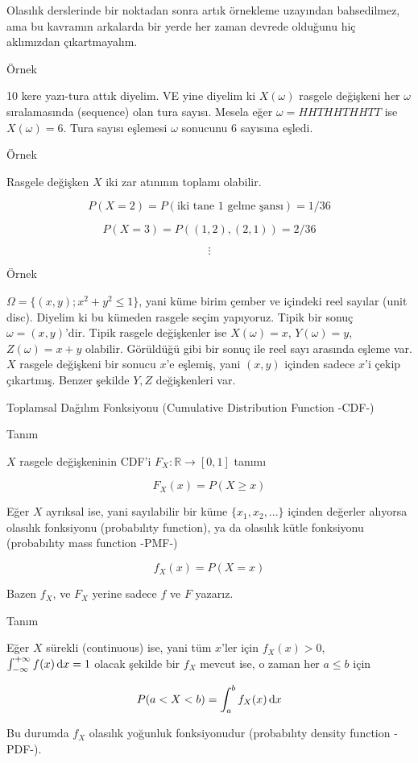 \documentclass[12pt,fleqn]{article}\usepackage{../../common}
\begin{document}
Olasılık derslerinde bir noktadan sonra artık örnekleme uzayından
bahsedilmez, ama bu kavramın arkalarda bir yerde her zaman devrede olduğunu
hiç aklımızdan çıkartmayalım. 

Örnek

10 kere yazı-tura attık diyelim. VE yine diyelim ki $X(\omega)$ rasgele
değişkeni her $\omega$ sıralamasında (sequence) olan tura sayısı. Mesela
eğer $\omega = HHTHHTHHTT$ ise $X(\omega) = 6$. Tura sayısı eşlemesi
$\omega$ sonucunu 6 sayısına eşledi.

Örnek

Rasgele değişken $X$ iki zar atınının toplamı olabilir. 

$$ P(X=2) = P(\textrm{iki tane 1 gelme şansı}) = 1/36 $$

$$ P(X=3) = P((1,2),(2,1)) = 2/36 $$

$$ \vdots $$

Örnek 

$\Omega = \{ (x,y); x^2+y^2 \le 1 \}$, yani küme birim çember ve içindeki
reel sayılar (unit disc). Diyelim ki bu kümeden rasgele seçim
yapıyoruz. Tipik bir sonuç $\omega = (x,y)$'dir. Tipik rasgele değişkenler
ise $X(\omega) = x$, $Y(\omega) = y$, $Z(\omega) = x+y$ olabilir. Görüldüğü
gibi bir sonuç ile reel sayı arasında eşleme var. $X$ rasgele değişkeni
bir sonucu $x$'e eşlemiş, yani $(x,y)$ içinden sadece $x$'i çekip
çıkartmış. Benzer şekilde $Y,Z$ değişkenleri var. 

Toplamsal Dağılım Fonksiyonu (Cumulative Distribution Function -CDF-)

Tanım

$X$ rasgele değişkeninin CDF'i $F_X: \mathbb{R} \to [0,1]$ tanımı

$$ F_X(x) = P(X \ge x) $$

Eğer $X$ ayrıksal ise, yani sayılabilir bir küme $\{x_1,x_2,...\}$ içinden
değerler alıyorsa olasılık fonksiyonu (probabılıty function), ya da
olasılık kütle fonksiyonu (probabılıty mass function -PMF-) 

$$ f_X(x) = P(X = x) $$

Bazen $f_X$, ve $F_X$ yerine sadece $f$ ve $F$ yazarız.

Tanım

Eğer $X$ sürekli (continuous) ise, yani tüm $x$'ler için $f_X(x) > 0$,
$\int_{-\infty}^{+\infty}f(x) \,\mathrm{d} x = 1$ olacak şekilde bir $f_X$ mevcut ise, o
zaman her $a \le b$ için

$$ P(a<X<b) = \int_{a}^{b}f_X(x) \,\mathrm{d} x $$

Bu durumda $f_X$ olasılık yoğunluk fonksiyonudur (probabılıty density function
-PDF-). 
\end{document}
